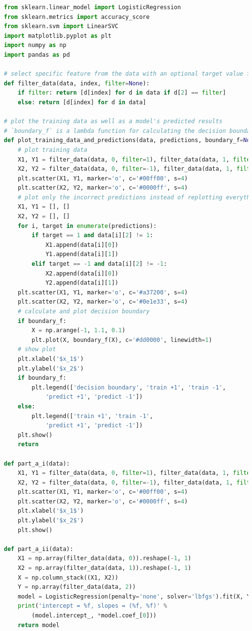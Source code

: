 \documentclass[12pt]{article}
\begin{document}
\lstset{basicstyle=\footnotesize}
\begin{lstlisting}[language=Python]
from sklearn.linear_model import LogisticRegression
from sklearn.metrics import accuracy_score
from sklearn.svm import LinearSVC
import matplotlib.pyplot as plt
import numpy as np
import pandas as pd

# select specific feature from the data with an optional target value filter
def filter_data(data, index, filter=None):
    if filter: return [d[index] for d in data if d[2] == filter]
    else: return [d[index] for d in data]

# plot the training data as well as a model's predicted results
# `boundary_f` is a lambda function for calculating the decision boundary
def plot_training_data_and_predictions(data, predictions, boundary_f=None):
    # plot training data
    X1, Y1 = filter_data(data, 0, filter=1), filter_data(data, 1, filter=1)
    X2, Y2 = filter_data(data, 0, filter=-1), filter_data(data, 1, filter=-1)
    plt.scatter(X1, Y1, marker='o', c='#00ff00', s=4)
    plt.scatter(X2, Y2, marker='o', c='#0000ff', s=4)
    # plot only the incorrect predictions instead of replotting everything
    X1, Y1 = [], []
    X2, Y2 = [], []
    for i, target in enumerate(predictions):
        if target == 1 and data[i][2] != 1:
            X1.append(data[i][0])
            Y1.append(data[i][1])
        elif target == -1 and data[i][2] != -1:
            X2.append(data[i][0])
            Y2.append(data[i][1])
    plt.scatter(X1, Y1, marker='o', c='#a37200', s=4)
    plt.scatter(X2, Y2, marker='o', c='#0e1e33', s=4)
    # calculate and plot decision boundary
    if boundary_f:
        X = np.arange(-1, 1.1, 0.1)
        plt.plot(X, boundary_f(X), c='#dd0000', linewidth=1)
    # show plot
    plt.xlabel('$x_1$')
    plt.ylabel('$x_2$')
    if boundary_f:
        plt.legend(['decision boundary', 'train +1', 'train -1',
            'predict +1', 'predict -1'])
    else:
        plt.legend(['train +1', 'train -1',
            'predict +1', 'predict -1'])
    plt.show()
    return

def part_a_i(data):
    X1, Y1 = filter_data(data, 0, filter=1), filter_data(data, 1, filter=1)
    X2, Y2 = filter_data(data, 0, filter=-1), filter_data(data, 1, filter=-1)
    plt.scatter(X1, Y1, marker='o', c='#00ff00', s=4)
    plt.scatter(X2, Y2, marker='o', c='#0000ff', s=4)
    plt.xlabel('$x_1$')
    plt.ylabel('$x_2$')
    plt.show()

def part_a_ii(data):
    X1 = np.array(filter_data(data, 0)).reshape(-1, 1)
    X2 = np.array(filter_data(data, 1)).reshape(-1, 1)
    X = np.column_stack((X1, X2))
    Y = np.array(filter_data(data, 2))
    model = LogisticRegression(penalty='none', solver='lbfgs').fit(X, Y)
    print('intercept = %f, slopes = (%f, %f)' %
        (model.intercept_, *model.coef_[0]))
    return model


\end{lstlisting}
\end{document}
